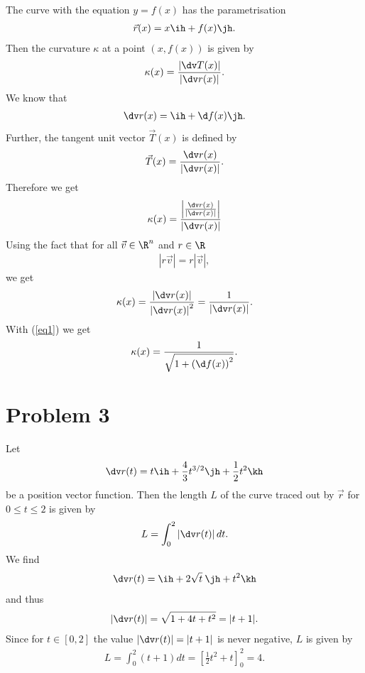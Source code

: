 \documentclass{article}
\begin{document}
The curve with the equation $y=f(x)$ has the parametrisation
\begin{align*}
  \vec r(x) = x \ih + f(x) \jh.
\end{align*}
Then the curvature $\kappa$ at a point $(x, f(x))$ is given by
\begin{align*}
  \kappa(x) = \frac{\left|\dv T(x)\right|}{\left|\dv r(x)\right|}.
\end{align*}
We know that
\begin{align}
  \label{eq1}
  \dv r (x) = \ih + \d f(x) \jh.
\end{align}
Further, the tangent unit vector $\vec T(x)$ is defined by
\begin{align*}
  \vec T(x) = \frac{\dv r(x)}{\left|\dv r(x)\right|}.
\end{align*}
Therefore we get
\begin{align*}
  \kappa(x) = \frac{\left|\frac{\dv r(x)}{\left|\dv r(x)\right|}\right|}{\left|\dv r(x)\right|}
\end{align*}
Using the fact that for all $\vec v \in \R^n$ and $r\in\R$
\begin{align*}
  \left|r\vec v\right| = r\left|\vec v\right|,
\end{align*}
we get
\begin{align*}
  \kappa(x) = \frac{\left|\dv r(x)\right|}{\left|\dv r(x)\right|^2} = \frac{1}{|\dv r(x)|}.
\end{align*}
With (\ref{eq1}) we get
\begin{align*}
  \kappa(x) = \frac{1}{\sqrt{1+\left(\d f(x)\right)^2}}.
\end{align*}


\section*{Problem 3}


Let
\begin{align*}
  \dv r(t) = t\ih + \frac{4}{3}t^{3/2}\jh + \frac{1}{2}t^2\kh
\end{align*}
be a position vector function.
Then the length $L$ of the curve traced out by $\vec r$ for $0\leq t \leq 2$ is given by
\begin{align*}
  L = \int_0^2 \left|\dv r(t)\right|dt.
\end{align*}
We find
\begin{align*}
  \dv r(t) = \ih + 2\sqrt{t}\:\jh + t^2\kh
\end{align*}
and thus
\begin{align*}
  |\dv r(t)| = \sqrt{1 + 4t + t^2}=|t+1|.
\end{align*}
Since for $t\in[0,2]$ the value $|\dv r(t)|=|t+1|$ is never
negative, $L$ is given by
\begin{align*}
  L = \int_0^2 (t+1)dt = \left[\frac{1}{2}t^2+t\right]_0^2=4.
\end{align*}
\end{document}
